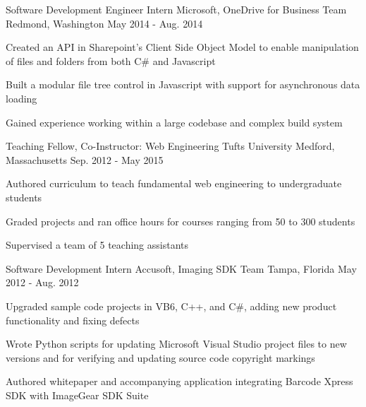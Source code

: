 \begin{cventries}
{\begin{cvitems}
      \end{cvitems}
    }
  \cventry
    {Software Development Engineer Intern}
    {Microsoft, OneDrive for Business Team}
    {Redmond, Washington}
    {May 2014 - Aug. 2014}
    {
      \begin{cvitems}
        \item {Created an API in Sharepoint's Client Side Object Model to enable manipulation of files and folders from both C\# and Javascript}
        \item {Built a modular file tree control in Javascript with support for asynchronous data loading}
        \item {Gained experience working within a large codebase and complex build system}
      \end{cvitems}
    }
  \cventry
    {Teaching Fellow, Co-Instructor: Web Engineering}
    {Tufts University}
    {Medford, Massachusetts}
    {Sep. 2012 - May 2015}
    {
      \begin{cvitems}
        \item {Authored curriculum to teach fundamental web engineering to undergraduate students}
        \item {Graded projects and ran office hours for courses ranging from 50 to 300 students}
        \item {Supervised a team of 5 teaching assistants}
      \end{cvitems}
    }
  \cventry
    {Software Development Intern}
    {Accusoft, Imaging SDK Team}
    {Tampa, Florida}
    {May 2012 - Aug. 2012}
    {
      \begin{cvitems}
        \item {Upgraded sample code projects in VB6, C++, and C\#, adding new product functionality and fixing defects}
        \item {Wrote Python scripts for updating Microsoft Visual Studio project files to new versions and for verifying and updating source code copyright markings}
        \item {Authored whitepaper and accompanying application integrating Barcode Xpress SDK with ImageGear SDK Suite}
      \end{cvitems}
    }

\end{cventries}
